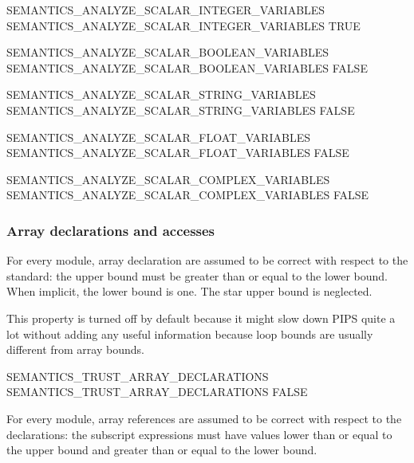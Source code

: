 \documentclass[a4paper]{report}
\begin{document}
\begin{PipsProp}{SEMANTICS_ANALYZE_SCALAR_INTEGER_VARIABLES}
SEMANTICS_ANALYZE_SCALAR_INTEGER_VARIABLES TRUE
\end{PipsProp}

\begin{PipsProp}{SEMANTICS_ANALYZE_SCALAR_BOOLEAN_VARIABLES}
SEMANTICS_ANALYZE_SCALAR_BOOLEAN_VARIABLES FALSE
\end{PipsProp}

\begin{PipsProp}{SEMANTICS_ANALYZE_SCALAR_STRING_VARIABLES}
SEMANTICS_ANALYZE_SCALAR_STRING_VARIABLES FALSE
\end{PipsProp}

\begin{PipsProp}{SEMANTICS_ANALYZE_SCALAR_FLOAT_VARIABLES}
SEMANTICS_ANALYZE_SCALAR_FLOAT_VARIABLES FALSE
\end{PipsProp}

\begin{PipsProp}{SEMANTICS_ANALYZE_SCALAR_COMPLEX_VARIABLES}
SEMANTICS_ANALYZE_SCALAR_COMPLEX_VARIABLES FALSE
\end{PipsProp}

\subsubsection{Array declarations and accesses}
\label{subsubsection:array-declarations-and-accesses}

For every module, array declaration are assumed to be correct with respect
to the standard: the upper bound must be greater than or equal to the
lower bound. When implicit, the lower bound is one. The star upper bound
is neglected.

This property is turned off by default because it might slow down PIPS
quite a lot without adding any useful information because loop bounds are
usually different from array bounds.

\begin{PipsProp}{SEMANTICS_TRUST_ARRAY_DECLARATIONS}
SEMANTICS_TRUST_ARRAY_DECLARATIONS FALSE
\end{PipsProp}

For every module, array references are assumed to be correct with respect
to the declarations: the subscript expressions must have values lower than
or equal to the upper bound and greater than or equal to the lower bound.
\end{document}
